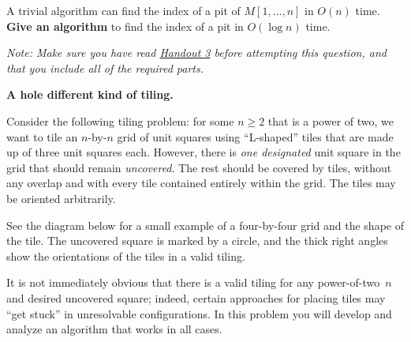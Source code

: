 \documentclass[11pt,addpoints]{exam}
\begin{document}
\begin{questions}
  A trivial algorithm can find the index of a pit of $M[1,\ldots,n]$ in $O(n)$ time.
  \textbf{Give an algorithm} to find the index of a pit in $O(\log n)$ time.
      

   \textit{Note: Make sure you have read \href{https://drive.google.com/file/d/1LzHBuS9pBCy12QMJ91PyLaDOnNW4NFn0/view?usp=drive_link}{Handout 3} before attempting this question, and that you include all of the required parts.}
      
  \begin{solution}
   
  \end{solution}



  \question \textbf{A hole different kind of tiling.} 

  Consider the following tiling problem: for some $n \geq 2$ that is a power of two, we want to tile an $n$-by-$n$ grid of unit squares using ``L-shaped'' tiles that are made up of three unit squares each.
  However, there is \emph{one designated} unit square in the grid that should remain \emph{uncovered}.
  The rest should be covered by tiles, without any overlap and with every tile contained entirely within the grid.
  The tiles may be oriented arbitrarily.

  See the diagram below for a small example of a four-by-four grid and the shape of the tile.
  The uncovered square is marked by a circle, and the thick right angles show the orientations of the tiles in a valid tiling.

  \begin{center}
  \end{center}
  
  It is not immediately obvious that there is a valid tiling for any power-of-two~$n$ and desired uncovered square; indeed, certain approaches for placing tiles may ``get stuck'' in unresolvable configurations.
  In this problem you will develop and analyze an algorithm that works in all cases. 


\end{questions}
\end{document}
